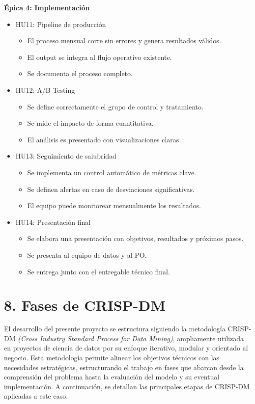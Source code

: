 \documentclass[
11pt, %
]{charter}
\begin{document}
\textbf{\'Epica 4: Implementación}
\begin{itemize}
  \item HU11: Pipeline de producción
  \begin{itemize}
    \item El proceso mensual corre sin errores y genera resultados válidos.
    \item El output se integra al flujo operativo existente.
    \item Se documenta el proceso completo.
  \end{itemize}
  \item HU12: A/B Testing
  \begin{itemize}
    \item Se define correctamente el grupo de control y tratamiento.
    \item Se mide el impacto de forma cuantitativa.
    \item El análisis es presentado con visualizaciones claras.
  \end{itemize}
  \item HU13: Seguimiento de salubridad
  \begin{itemize}
    \item Se implementa un control automático de métricas clave.
    \item Se definen alertas en caso de desviaciones significativas.
    \item El equipo puede monitorear mensualmente los resultados.
  \end{itemize}
  \item HU14: Presentación final
  \begin{itemize}
    \item Se elabora una presentación con objetivos, resultados y próximos pasos.
    \item Se presenta al equipo de datos y al PO.
    \item Se entrega junto con el entregable técnico final.
  \end{itemize}
\end{itemize}

\section{8. Fases de CRISP-DM}

El desarrollo del presente proyecto se estructura siguiendo la metodología CRISP-DM  \textit{(Cross Industry Standard Process for Data Mining)}, ampliamente utilizada en proyectos de ciencia de datos por su enfoque iterativo, modular y orientado al negocio. Esta metodología permite alinear los objetivos técnicos con las necesidades estratégicas, estructurando el trabajo en fases que abarcan desde la comprensión del problema hasta la evaluación del modelo y su eventual implementación. A continuación, se detallan las principales etapas de CRISP-DM aplicadas a este caso.
\end{document}
